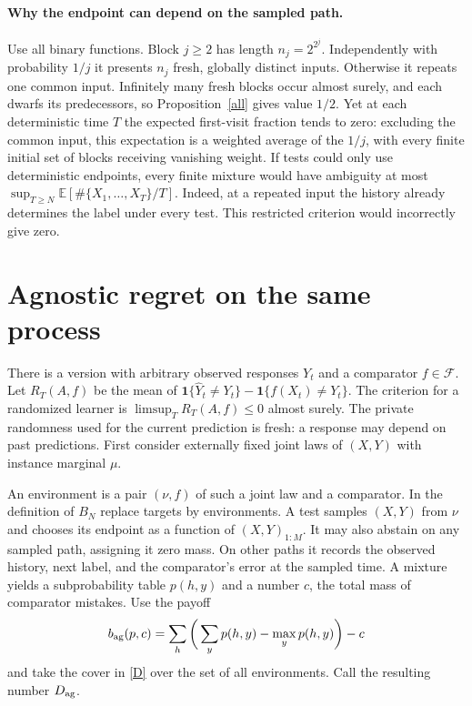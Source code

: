 \documentclass[11pt]{article}
\newcommand{\E}{\mathbb E}
\newcommand{\F}{\mathcal F}
\newcommand{\ind}{\mathbf1}
\begin{document}
\paragraph{Why the endpoint can depend on the sampled path.}
Use all binary functions. Block $j\ge2$ has length $n_j=2^{2^j}$. Independently with probability $1/j$ it presents $n_j$ fresh, globally distinct inputs. Otherwise it repeats one common input. Infinitely many fresh blocks occur almost surely, and each dwarfs its predecessors, so Proposition~\ref{all} gives value $1/2$. Yet at each deterministic time $T$ the expected first-visit fraction tends to zero: excluding the common input, this expectation is a weighted average of the $1/j$, with every finite initial set of blocks receiving vanishing weight. If tests could only use deterministic endpoints, every finite mixture would have ambiguity at most $\sup_{T\ge N}\E[\#\{X_1,\ldots,X_T\}/T]$. Indeed, at a repeated input the history already determines the label under every test. This restricted criterion would incorrectly give zero.

\section{Agnostic regret on the same process}
There is a version with arbitrary observed responses $Y_t$ and a comparator $f\in\F$. Let $R_T(A,f)$ be the mean of $\ind\{\widehat Y_t\ne Y_t\}-\ind\{f(X_t)\ne Y_t\}$. The criterion for a randomized learner is $\limsup_T R_T(A,f)\le0$ almost surely. The private randomness used for the current prediction is fresh: a response may depend on past predictions. First consider externally fixed joint laws of $(X,Y)$ with instance marginal $\mu$.

An environment is a pair $(\nu,f)$ of such a joint law and a comparator. In the definition of $B_N$ replace targets by environments. A test samples $(X,Y)$ from $\nu$ and chooses its endpoint as a function of $(X,Y)_{1:M}$. It may also abstain on any sampled path, assigning it zero mass. On other paths it records the observed history, next label, and the comparator's error at the sampled time. A mixture yields a subprobability table $p(h,y)$ and a number $c$, the total mass of comparator mistakes. Use the payoff
\[
 b_{\rm ag}(p,c)=\sum_h\bigg(\sum_y p(h,y)-\max_y p(h,y)\bigg)-c
\]
and take the cover in \eqref{D} over the set of all environments. Call the resulting number $D_{\rm ag}$.
\end{document}
